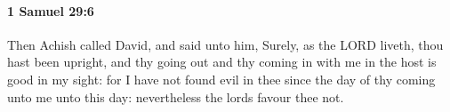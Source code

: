
		\paragraph{1 Samuel 29:6} %
			\label{1SAMUEL-29-6}

			Then Achish called David, and said unto him, Surely, as the LORD liveth, thou hast been upright, and thy going out and thy coming in with me in the host is good in my sight: for I have not found evil in thee since the day of thy coming unto me unto this day: nevertheless the lords favour thee not.


